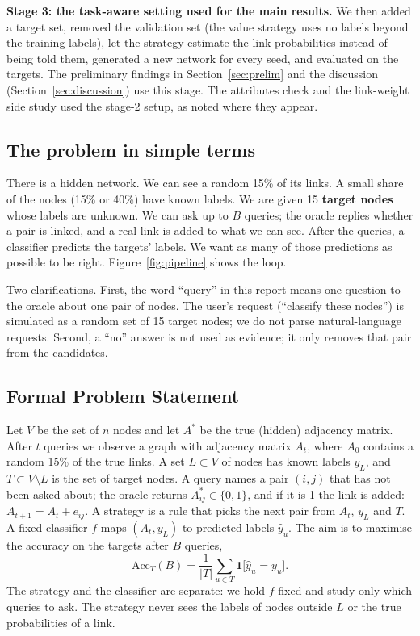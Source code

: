 \documentclass[11pt,a4paper]{article}
\begin{document}
\textbf{Stage 3: the task-aware setting used for the main results.} We then added a target set,
removed the validation set (the value strategy uses no labels beyond the training labels), let
the strategy estimate the link probabilities instead of being told them, generated a new
network for every seed, and evaluated on the targets. The preliminary findings in
Section~\ref{sec:prelim} and the discussion (Section~\ref{sec:discussion}) use this stage. The
attributes check and the link-weight side study used the stage-2 setup, as noted where they
appear.

\subsection{The problem in simple terms}
There is a hidden network. We can see a random 15\% of its links. A small share of the nodes
(15\% or 40\%) have known labels. We are given 15 \textbf{target nodes} whose labels are
unknown. We can ask up to $B$ queries; the oracle replies whether a pair is linked, and a
real link is added to what we can see. After the queries, a classifier predicts the targets'
labels. We want as many of those predictions as possible to be right. Figure~\ref{fig:pipeline}
shows the loop.

Two clarifications. First, the word ``query'' in this report means one question to the oracle
about one pair of nodes. The user's request (``classify these nodes'') is simulated as a random
set of 15 target nodes; we do not parse natural-language requests. Second, a ``no'' answer is
not used as evidence; it only removes that pair from the candidates.

\subsection{Formal Problem Statement}
Let $V$ be the set of $n$ nodes and let $A^{*}$ be the true (hidden) adjacency matrix. After
$t$ queries we observe a graph with adjacency matrix $A_t$, where $A_0$ contains a random 15\%
of the true links. A set $L\subset V$ of nodes has known labels $y_L$, and $T\subset V\setminus L$
is the set of target nodes. A query names a pair $(i,j)$ that has not been asked about; the
oracle returns $A^{*}_{ij}\in\{0,1\}$, and if it is 1 the link is added: $A_{t+1}=A_t+e_{ij}$.
A strategy is a rule that picks the next pair from $A_t$, $y_L$ and $T$. A fixed classifier $f$
maps $(A_t,y_L)$ to predicted labels $\hat y_u$. The aim is to maximise the accuracy on the
targets after $B$ queries,
\begin{equation}
\mathrm{Acc}_T(B)=\frac{1}{|T|}\sum_{u\in T}\mathbf{1}\bigl[\hat y_u=y_u\bigr].
\end{equation}
The strategy and the classifier are separate: we hold $f$ fixed and study only which queries
to ask. The strategy never sees the labels of nodes outside $L$ or the true probabilities of
a link.
\end{document}
